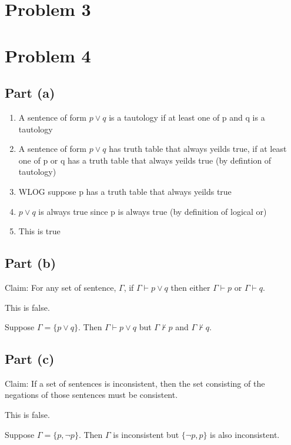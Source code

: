 \documentclass[12pt]{article}
\begin{document}
\section*{Problem 3}


\section*{Problem 4}


\subsection*{Part (a)}

\begin{enumerate}
    \item A sentence of form $p \lor q$ is a tautology if at least one of p and q is a tautology
    \item A sentence of form $p \lor q$ has truth table that always yeilds true, if at least one of p or q has a truth table that always yeilds true (by defintion of tautology)
    \item WLOG suppose p has a truth table that always yeilds true
    \item $p \lor q$ is always true since p is always true (by definition of logical or)
    \item This is true
\end{enumerate}

\subsection*{Part (b)}

Claim: For any set of sentence, $\Gamma$, if $\Gamma \vdash p \lor q$ then either $\Gamma \vdash p$ or $\Gamma \vdash q$.

This is false.

Suppose $\Gamma = \{p \lor q\}$. Then $\Gamma \vdash p \lor q$ but $\Gamma \nvdash p$ and $\Gamma \nvdash q$.


\subsection*{Part (c)}

Claim: If a set of sentences is inconsistent, then the set consisting of the negations of those sentences must be consistent. 

This is false.

Suppose $\Gamma = \{p, \lnot p\}$. Then $\Gamma$ is inconsistent but $\{\lnot p, p\}$ is also inconsistent.
\end{document}
